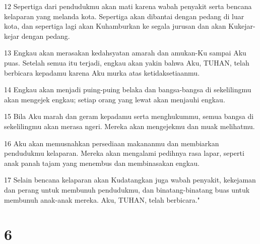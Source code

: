 \par 12 Sepertiga dari pendudukmu akan mati karena wabah penyakit serta bencana kelaparan yang melanda kota. Sepertiga akan dibantai dengan pedang di luar kota, dan sepertiga lagi akan Kuhamburkan ke segala jurusan dan akan Kukejar-kejar dengan pedang.
\par 13 Engkau akan merasakan kedahsyatan amarah dan amukan-Ku sampai Aku puas. Setelah semua itu terjadi, engkau akan yakin bahwa Aku, TUHAN, telah berbicara kepadamu karena Aku murka atas ketidaksetiaanmu.
\par 14 Engkau akan menjadi puing-puing belaka dan bangsa-bangsa di sekelilingmu akan mengejek engkau; setiap orang yang lewat akan menjauhi engkau.
\par 15 Bila Aku marah dan geram kepadamu serta menghukummu, semua bangsa di sekelilingmu akan merasa ngeri. Mereka akan mengejekmu dan muak melihatmu.
\par 16 Aku akan memusnahkan persediaan makananmu dan membiarkan pendudukmu kelaparan. Mereka akan mengalami pedihnya rasa lapar, seperti anak panah tajam yang menembus dan membinasakan engkau.
\par 17 Selain bencana kelaparan akan Kudatangkan juga wabah penyakit, kekejaman dan perang untuk membunuh pendudukmu, dan binatang-binatang buas untuk membunuh anak-anak mereka. Aku, TUHAN, telah berbicara."

\chapter{6}

